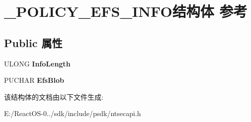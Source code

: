 \hypertarget{struct___p_o_l_i_c_y___e_f_s___i_n_f_o}{}\section{\+\_\+\+P\+O\+L\+I\+C\+Y\+\_\+\+E\+F\+S\+\_\+\+I\+N\+F\+O结构体 参考}
\label{struct___p_o_l_i_c_y___e_f_s___i_n_f_o}
\subsection*{Public 属性}
\begin{DoxyCompactItemize}
\item 
\mbox{\label{struct___p_o_l_i_c_y___e_f_s___i_n_f_o_a7df604ec82397771c2bb6214e898ba13}} 
U\+L\+O\+NG {\bfseries Info\+Length}
\item 
\mbox{\label{struct___p_o_l_i_c_y___e_f_s___i_n_f_o_a5567b4bcabec79afb8225508159f7cf8}} 
P\+U\+C\+H\+AR {\bfseries Efs\+Blob}
\end{DoxyCompactItemize}


该结构体的文档由以下文件生成\+:\begin{DoxyCompactItemize}
\item 
E\+:/\+React\+O\+S-\/0../sdk/include/psdk/ntsecapi.\+h\end{DoxyCompactItemize}
